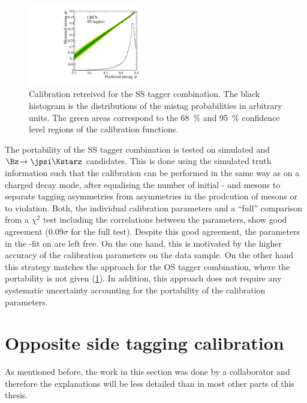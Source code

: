 \begin{figure}[tbp]
	\begin{center}
		\includegraphics[width=0.45\textwidth]{09FlavourTagging/figs/CalibrationSS.pdf}
	\end{center}
	\caption{Calibration retreived for the SS tagger combination.
	The black histogram is the distributions of the mistag probabilities in arbitrary units.
	The green areas correspond to the \SI{68}{\percent} and \SI{95}{\percent} confidence level regions of the calibration functions.}
	\label{fig:CalibSS}
\end{figure}

The portability of the SS tagger combination is tested on simulated \BdToDpi and $\Bz\!\to\jpsi\Kstarz$ candidates.
This is done using the simulated truth information such that the calibration can be performed in the same way as on a charged decay mode, after equalising the number of initial \Bz- and \Bzb mesons to separate tagging asymmetries from asymmetries in the prodcution of \B mesons or to \CP violation.
Both, the individual calibration parameters and a \enquote{full} comparison from a $\chi^2$ test including the correlations between the parameters, show good agreement (\eg $0.09\sigma$ for the full test).
Despite this good agreement, the parameters in the \CP-fit on \BdToDpi are left free.
On the one hand, this is  motivated by the higher accuracy of the calibration parameters on the \BdToDpi data sample.
On the other hand this strategy matches the approach for the OS tagger combination, where the portability is not given (\cref{sec:OScalibration}).
In addition, this approach does not require any systematic uncertainty accounting for the portability of the calibration parameters.

\section{Opposite side tagging calibration}
\label{sec:OScalibration}

As mentioned before, the work in this section was done by a collaborator and therefore the explanations will be less detailed than in most other parts of this thesis.

